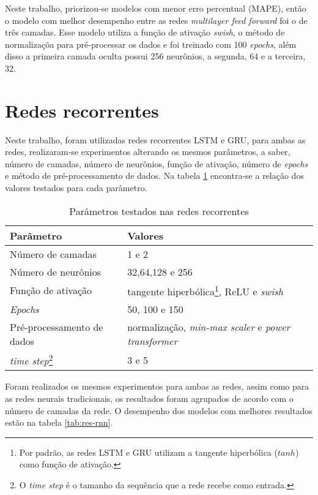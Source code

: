 Neste trabalho, priorizou-se modelos com menor erro percentual (MAPE), então 
o modelo com melhor desempenho entre as redes \textit{multilayer feed forward}
foi o de três camadas. Esse modelo utiliza a função de ativação \textit{swish},
o método de normalizaçõa para pré-processar os dados e foi treinado com 100 
\textit{epochs}, além disso a primeira camada oculta possui 256 neurônios, a 
segunda, 64 e a terceira, 32.

\section{Redes recorrentes}

Neste trabalho, foram utilizadas redes recorrentes LSTM e GRU, para ambas as 
redes, realizaram-se experimentos alterando os mesmos parâmetros, a saber,
número de camadas, número de neurônios, função de ativação, número de \textit{epochs}
e método de pré-processamento de dados. Na tabela \ref{tab:param-rnn} encontra-se 
a relação dos valores testados para cada parâmetro.

\begin{table}[H]
    \centering
    \begin{tabular}{ll}
        \toprule
        Parâmetro           & Valores   \\
        \midrule
        Número de camadas   & 1 e 2 \\
        Número de neurônios & 32,64,128 e 256       \\
        Função de ativação  & tangente hiperbólica\footnote{Por padrão, as redes LSTM e GRU utilizam a tangente hiperbólica ($tanh$) como função de ativação.}, ReLU e \textit{swish}  \\
        \textit{Epochs}              & 50, 100 e 150      \\
        Pré-processamento de dados & normalização, \textit{min-max scaler} e \textit{power transformer}\\
        \textit{time step}\footnote{O \textit{time step} é o tamanho da sequência que a rede recebe como entrada.}  & 3 e 5 \\
        \bottomrule
    \end{tabular}
    \caption{Parâmetros testados nas redes recorrentes}
    \label{tab:param-rnn}
\end{table} 

Foram realizados os mesmos experimentos para ambas as redes, assim como para 
as redes neurais tradicionais, os resultados foram agrupados de acordo com 
o número de camadas da rede. O desempenho dos modelos com melhores resultados 
estão na tabela \ref{tab:res-rnn}.

